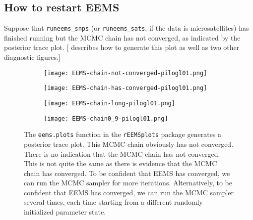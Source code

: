 \documentclass[a4paper,10pt,DIV=15,titlepage,mpinclude=true]{scrartcl}
\newcommand{\keystring}[1]{{\tt #1}}
\begin{document}

\subsection{How to restart EEMS}

Suppose that \keystring{runeems\_snps} (or \keystring{runeems\_sats}, if the data is microsatellites) has finished running but the MCMC chain has not converged, as indicated by the posterior trace plot. [ describes how to generate this plot as well as two other diagnostic figures.]

\begin{figure}[htb]

\begin{subfigure}[t]{0.47\textwidth}
\centering
\texttt{[image: EEMS-chain-not-converged-pilogl01.png]}
\caption{}
\label{fig:EEMS-convergence:not-converged}
\end{subfigure}
\begin{subfigure}[t]{0.47\textwidth}
\centering
\texttt{[image: EEMS-chain-has-converged-pilogl01.png]}
\caption{}
\label{fig:EEMS-convergence:has-converged}
\end{subfigure}

\vspace{20pt}

\begin{subfigure}[t]{0.47\textwidth}
\centering
\texttt{[image: EEMS-chain-long-pilogl01.png]}
\caption{}
\label{fig:EEMS-convergence:long-chain}
\end{subfigure}
\begin{subfigure}[t]{0.47\textwidth}
\centering
\texttt{[image: EEMS-chain0\_9-pilogl01.png]}
\caption{}
\label{fig:EEMS-convergence:multiple-chains}
\end{subfigure}


\caption[EEMS graphics with default options]{The \keystring{eems.plots} function in the \keystring{rEEMSplots} package generates a posterior trace plot. 
 This MCMC chain obviously has not converged. 
 There is no indication that the MCMC chain has not converged. This is not quite the same as there is evidence that the MCMC chain has converged. 
 To be confident that EEMS has converged, we can run the MCMC sampler for more iterations.
 Alternatively, to be confident that EEMS has converged, we can run the MCMC sampler several times, each time starting from a different randomly initialized parameter state.}
\label{fig:EEMS-convergence}
\end{figure}
\end{document}
